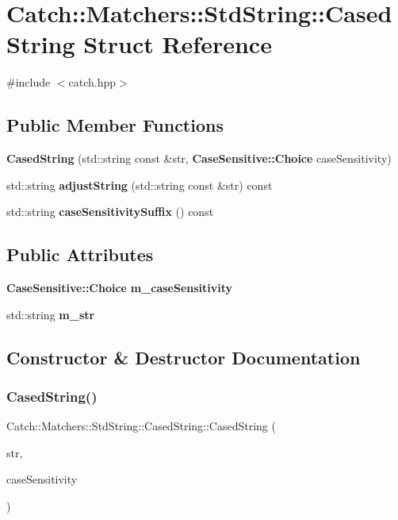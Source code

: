 \section{Catch\+::Matchers\+::Std\+String\+::Cased\+String Struct Reference}
\label{struct_catch_1_1_matchers_1_1_std_string_1_1_cased_string}


{\ttfamily \#include $<$catch.\+hpp$>$}

\subsection*{Public Member Functions}
\begin{DoxyCompactItemize}
\item 
\textbf{ Cased\+String} (std\+::string const \&str, \textbf{ Case\+Sensitive\+::\+Choice} case\+Sensitivity)
\item 
std\+::string \textbf{ adjust\+String} (std\+::string const \&str) const
\item 
std\+::string \textbf{ case\+Sensitivity\+Suffix} () const
\end{DoxyCompactItemize}
\subsection*{Public Attributes}
\begin{DoxyCompactItemize}
\item 
\textbf{ Case\+Sensitive\+::\+Choice} \textbf{ m\+\_\+case\+Sensitivity}
\item 
std\+::string \textbf{ m\+\_\+str}
\end{DoxyCompactItemize}


\subsection{Constructor \& Destructor Documentation}
\mbox{\label{struct_catch_1_1_matchers_1_1_std_string_1_1_cased_string_aa88bbc5acd2bff22351d8d4b1816b561}} 
\subsubsection{CasedString()}
{\footnotesize\ttfamily Catch\+::\+Matchers\+::\+Std\+String\+::\+Cased\+String\+::\+Cased\+String (\begin{DoxyParamCaption}\item[{std\+::string const \&}]{str,  }\item[{\textbf{ Case\+Sensitive\+::\+Choice}}]{case\+Sensitivity }\end{DoxyParamCaption})}



